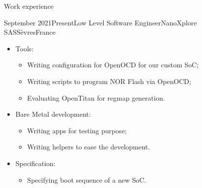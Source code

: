 \documentclass[a4paper, 10pt]{article}
\begin{document}
\begin{section} {Work experience}
    \begin{experience}{September 2021}{Present}{Low Level Software Engineer}{NanoXplore SAS}{S\`{e}vres}{France}
     \begin{subexperience}
		\begin{itemize}[parsep=0cm,itemsep=0cm,topsep=0cm]
			\item Tools:
				\begin{itemize}[parsep=0cm,itemsep=0cm,topsep=0cm]
					\item Writing configuration for OpenOCD for our custom SoC;
					\item Writing scripts to program NOR Flash via OpenOCD;
					\item Evaluating OpenTitan for regmap generation.
				\end{itemize}
			\item Bare Metal development:
				\begin{itemize}[parsep=0cm,itemsep=0cm,topsep=0cm]
					\item Writing apps for testing purpose;
					\item Writing helpers to ease the development.
				\end{itemize}
			\item Specification:
				\begin{itemize}[parsep=0cm,itemsep=0cm,topsep=0cm]
					\item Specifying boot sequence of a new SoC.
				\end{itemize}
		\end{itemize}
	\end{subexperience}
	\end{experience}


\end{section}
\end{document}
